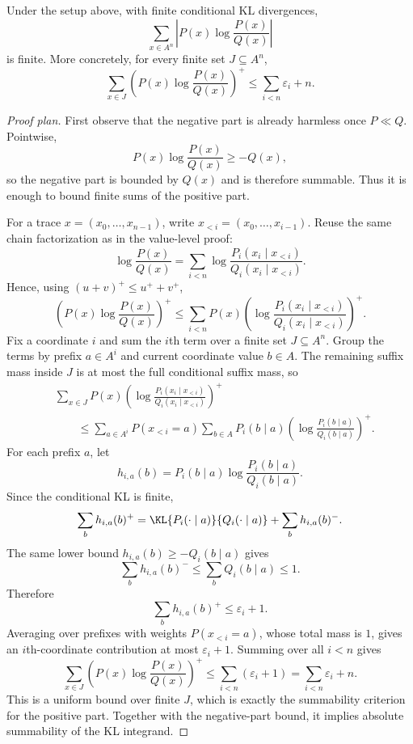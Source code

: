 \begin{lemma}
Under the setup above, with finite conditional KL divergences,
\[
  \sum_{x \in A^n}
    \left|P(x)\log\frac{P(x)}{Q(x)}\right|
\]
is finite.  More concretely, for every finite set $J \subseteq A^n$,
\[
  \sum_{x \in J}
    \left(P(x)\log\frac{P(x)}{Q(x)}\right)^+
  \leq
  \sum_{i < n} \varepsilon_i + n.
\]
\end{lemma}

\begin{proof}[Proof plan]
First observe that the negative part is already harmless once
$P \ll Q$.  Pointwise,
\[
  P(x)\log\frac{P(x)}{Q(x)} \geq -Q(x),
\]
so the negative part is bounded by $Q(x)$ and is therefore summable.  Thus it
is enough to bound finite sums of the positive part.

For a trace $x=(x_0,\ldots,x_{n-1})$, write
$x_{<i}=(x_0,\ldots,x_{i-1})$.  Reuse the same chain factorization as in the
value-level proof:
\[
  \log\frac{P(x)}{Q(x)}
  =
  \sum_{i<n}
    \log
      \frac{P_i(x_i \mid x_{<i})}
           {Q_i(x_i \mid x_{<i})}.
\]
Hence, using $(u+v)^+ \leq u^+ + v^+$,
\[
  \left(P(x)\log\frac{P(x)}{Q(x)}\right)^+
  \leq
  \sum_{i<n}
    P(x)
    \left(
      \log
      \frac{P_i(x_i \mid x_{<i})}
           {Q_i(x_i \mid x_{<i})}
    \right)^+.
\]
Fix a coordinate $i$ and sum the $i$th term over a finite set
$J \subseteq A^n$.  Group the terms by prefix $a \in A^i$ and current
coordinate value $b \in A$.  The remaining suffix mass inside $J$ is at most
the full conditional suffix mass, so
\[
\begin{aligned}
  &\sum_{x \in J}
    P(x)
    \left(
      \log
      \frac{P_i(x_i \mid x_{<i})}
           {Q_i(x_i \mid x_{<i})}
    \right)^+
  \\
  &\qquad\leq
  \sum_{a \in A^i} P(x_{<i}=a)
  \sum_{b \in A}
    P_i(b \mid a)
    \left(
      \log\frac{P_i(b \mid a)}{Q_i(b \mid a)}
    \right)^+.
\end{aligned}
\]
For each prefix $a$, let
\[
  h_{i,a}(b)
  =
  P_i(b \mid a)\log\frac{P_i(b \mid a)}{Q_i(b \mid a)}.
\]
Since the conditional KL is finite,
\[
  \sum_b h_{i,a}(b)^+
  =
  \KL{P_i(\cdot \mid a)}{Q_i(\cdot \mid a)}
  +
  \sum_b h_{i,a}(b)^-.
\]
The same lower bound $h_{i,a}(b)\geq -Q_i(b\mid a)$ gives
\[
  \sum_b h_{i,a}(b)^-
  \leq
  \sum_b Q_i(b \mid a)
  \leq 1.
\]
Therefore
\[
  \sum_b h_{i,a}(b)^+
  \leq
  \varepsilon_i + 1.
\]
Averaging over prefixes with weights $P(x_{<i}=a)$, whose total mass is $1$,
gives an $i$th-coordinate contribution at most $\varepsilon_i+1$.  Summing over
all $i<n$ gives
\[
  \sum_{x \in J}
    \left(P(x)\log\frac{P(x)}{Q(x)}\right)^+
  \leq
  \sum_{i<n}(\varepsilon_i+1)
  =
  \sum_{i<n}\varepsilon_i+n.
\]
This is a uniform bound over finite $J$, which is exactly the summability
criterion for the positive part.  Together with the negative-part bound, it
implies absolute summability of the KL integrand.
\end{proof}

